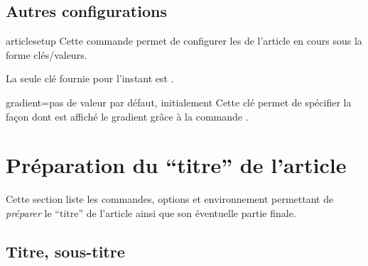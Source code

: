 \documentclass[english,nolocaltoc]{nwejmart}
\newtheorem[style=definition]{fait}
\newtheorem[title=expérience]{experience}
\newtheorem[title-plural=anneaux]{anneau}
\newtheorem[title=idéal,title-plural=idéaux]{ideal}
\begin{document}
\subsection{Autres configurations}
\label{sec:autr-conf}

\begin{docCommand}{articlesetup}{}
  Cette commande permet de configurer les  de l'article en cours
  sous la forme clés/valeurs.

  La seule clé fournie pour l'instant est .
  \begin{docKey}{gradient}{=\textbar{}}{pas
      de valeur par défaut, initialement }
    Cette clé permet de spécifier la façon dont est affiché le gradient grâce
    à la commande .
  \end{docKey}
\end{docCommand}


\section{Préparation du \enquote{titre} de l'article}
\label{sec-prep-de-lart}

Cette section liste les commandes, options et environnement permettant de
\emph{préparer} le \enquote{titre} de l'article ainsi que son éventuelle partie
finale.

\subsection{Titre, sous-titre}
\label{sec-titre}
\end{document}
